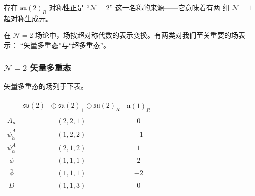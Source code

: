存在 $\mathfrak{su}(2)_{R}$ 对称性正是 “$\mathcal{N}=2$” 这一名称的来源——它意味着有两
组 $\mathcal{N}=1$ 超对称生成元。

在 $\mathcal{N}=2$ 场论中，场按超对称代数的表示变换。有两类对我们至关重要的场表示：
“矢量多重态”与“超多重态”。

\subsubsection{$\mathcal{N}=2$ 矢量多重态}
\label{sec:4-2-1}

矢量多重态的场列于下表。

\begin{center}
\renewcommand{\arraystretch}{1.18}
\begin{tabular}{|c|c|c|}
\hline
 & $\mathfrak{su}(2)_{-}\oplus\mathfrak{su}(2)_{+}\oplus\mathfrak{su}(2)_{R}$
 & $\mathfrak{u}(1)_{R}$\\
\hline
$A_{\mu}$                  & $(2,2,1)$ & $0$\\
\hline
$\bar{\psi}^{A}_{\dot\alpha}$ & $(1,2,2)$ & $-1$\\
\hline
$\psi^{A}_{\alpha}$        & $(2,1,2)$ & $1$\\
\hline
$\phi$                     & $(1,1,1)$ & $2$\\
\hline
$\bar{\phi}$               & $(1,1,1)$ & $-2$\\
\hline
$D$                        & $(1,1,3)$ & $0$\\
\hline
\end{tabular}
\end{center}


